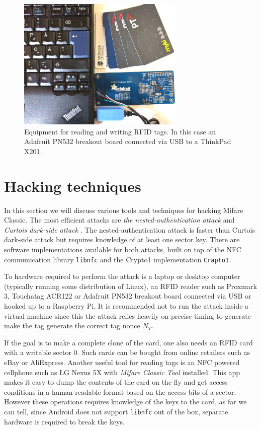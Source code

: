 \documentclass[10pt,twocolumn]{article}
\begin{document}
\begin{figure}[ht!]
\includegraphics[width=8cm]{nfc-tools.jpg}
\caption{Equipment for reading and writing RFID tags. In this case an Adafruit PN532 breakout board connected via USB to a ThinkPad X201.}
\label{fig:nfctools}
\end{figure}

\section{Hacking techniques}
\label{attack-tools}
In this section we will discuss various tools and techniques for hacking Mifare Classic. The most efficient attacks are \textit{the nested-authentication attack} \cite{garcia09} and \textit{Curtois dark-side attack} \cite{curtois09}. The nested-authentication attack is faster than Curtois dark-side attack but requires knowledge of at least one sector key. There are software implementations available for both attacks, built on top of the NFC communication library \verb!libnfc! and the Crypto1 implementation \verb!Crapto1!.

To hardware required to perform the attack is a laptop or desktop computer (typically running some distribution of Linux), an RFID reader such as Proxmark 3, Touchatag ACR122 or Adafruit PN532 breakout board connected via USB or hooked up to a Raspberry Pi. It is recommended not to run the attack inside a virtual machine since this the attack relies heavily on precise timing to generate make the tag generate the correct tag nonce $N_T$.

If the goal is to make a complete clone of the card, one also needs an RFID card with a writable sector 0. Such cards can be bought from online retailers such as eBay or AliExpress. Another useful tool for reading tags is an NFC powered cellphone such as LG Nexus 5X with \textit{Mifare Classic Tool} installed. This app makes it easy to dump the contents of the card on the fly and get access conditions in a human-readable format based on the access bits of a sector. However these operations requires knowledge of the keys to the card, as far we can tell, since Android does not support \verb!libnfc! out of the box, separate hardware is required to break the keys.
\end{document}
